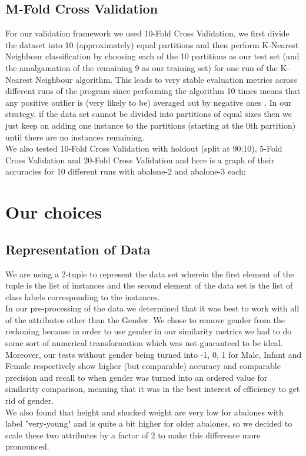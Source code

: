 \subsection{M-Fold Cross Validation}

For our validation framework we used 10-Fold Cross Validation, we first divide the dataset into 10 (approximately) equal partitions and then perform K-Nearest Neighbour classification by choosing each of the 10 partitions as our test set (and the amalgamation of the remaining 9 as our training set) for one run of the K-Nearest Neighbour algorithm. This leads to very stable evaluation metrics across different runs of the program since performing the algorithm 10 times means that any positive outlier is (very likely to be) averaged out by negative ones
. In our strategy, if the data set cannot be divided into partitions of equal sizes then we just keep on adding one instance to the partitions (starting at the 0th partition) until there are no instances remaining.\\

We also tested 10-Fold Cross Validation with holdout (split at 90:10), 5-Fold Cross Validation and 20-Fold Cross Validation and here is a graph of their accuracies for 10 different runs with abalone-2 and abalone-3 each:





\section{Our choices}

\subsection{Representation of Data}

We are using a 2-tuple to represent the data set wherein the first element of the tuple is the list of instances and the second element of the data set is the list of class labels corresponding to the instances. \\
In our pre-processing of the data we determined that it was best to work with all of the attributes other than the Gender. We chose to remove gender from the reckoning because in order to use gender in our similarity metrics we had to do some sort of numerical transformation which was not guaranteed to be ideal. Moreover, our tests without gender being turned into -1, 0, 1 for Male, Infant and Female respectively show higher (but comparable) accuracy and comparable precision and recall to when gender was turned into an ordered value for similarity comparison, meaning that it was in the best interest of efficiency to get rid of gender.  \\
We also found that height and shucked weight are very low for abalones with label "very-young" and is quite a bit higher for older abalones, so we decided to scale these two attributes by a factor of 2 to make this difference more pronounced. 

